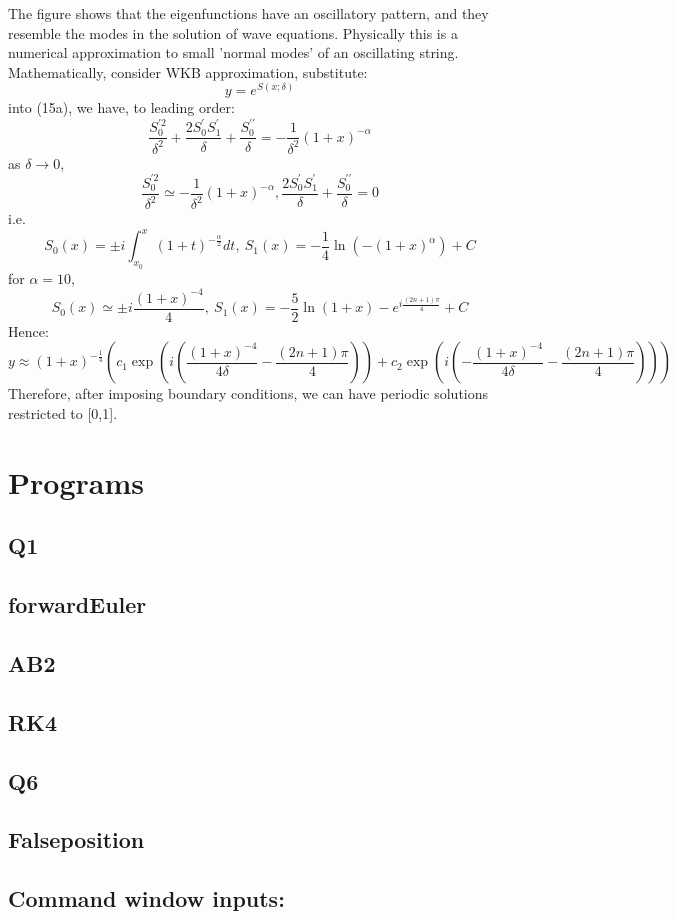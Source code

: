 \documentclass[11pt]{article}
\begin{document}
The figure shows that the eigenfunctions have an oscillatory pattern, and they resemble the modes in the solution of wave equations. Physically this is a numerical approximation to small 'normal modes' of an oscillating string. Mathematically, consider WKB approximation, substitute:
$$ y = e^{S(x;\delta)}$$ into (15a), we have, to leading order:
$$\frac{{S}_{0}^{\prime2}}{\delta^{2}}+\frac{2S_{0}^{\prime}S_{1}^{\prime}}{\delta}+\frac{{S}_{0}^{\prime\prime}}{\delta} = -\frac{1}{\delta^2}(1+x)^{-\alpha}$$
as $\delta \to 0$, $$ \frac{{S}_{0}^{\prime2}}{\delta^{2}} \simeq -\frac{1}{\delta^2}(1+x)^{-\alpha}, \frac{2S_{0}^{\prime}S_{1}^{\prime}}{\delta}+\frac{{S}_{0}^{\prime\prime}}{\delta}=0$$ i.e.
$$S_{0}(x) =\pm i\int_{x_{0}}^{x}(1+t)^{-\frac{\alpha}{2}} dt,\ S_{1}(x) = -\frac{1}{4}\ln(-(1+x)^{\alpha}) + C$$
for $\alpha = 10$, $$S_{0}(x) \simeq \pm i\frac{(1+x)^{-4}}{4},\ S_{1}(x) = -\frac{5}{2}\ln(1+x) -e^{i\frac{(2n+1)\pi}{4}} +C$$
Hence: $$ y \approx (1+x)^{-\frac{1}{4}}\left(c_{1}\exp\left(i\left(\frac{(1+x)^{-4}}{4\delta}-\frac{(2n+1)\pi}{4}\right)\right)+c_{2}\exp\left(i\left(-\frac{(1+x)^{-4}}{4\delta}-\frac{(2n+1)\pi}{4}\right)\right)\right)$$
Therefore, after imposing boundary conditions, we can have periodic solutions restricted to [0,1].     
\newpage
\appendix
\section{Programs}
\subsection*{Q1}

\subsection*{forwardEuler}

\subsection*{AB2}

\subsection*{RK4}

\subsection*{Q6}

\subsection*{Falseposition}

\subsection*{Command window inputs:}

\end{document}
